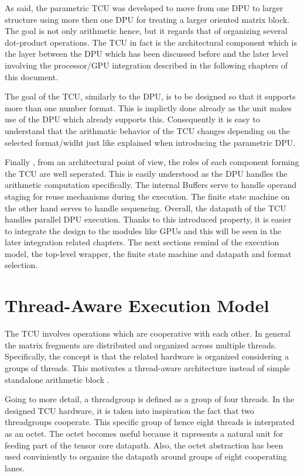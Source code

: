 As said, the parametric TCU was developed to move from one DPU to larger structure using more then one DPU for treating a larger oriented matrix block. The goal is not only arithmetic hence, but it regards that of organizing several dot-product operations. The TCU in fact is the architectural component which is the layer between the DPU which has been discussed before and the later level involving the processor/GPU integration described in the following chapters of this document.

The goal of the TCU, similarly to the DPU, is to be designed so that it supports more than one number format. This is implictly done already as the unit makes use of the DPU which already supports this. Consequently it is easy to understand that the arithmatic behavior of the TCU changes depending on the selected format/widht just like explained when introducing the parametric DPU.

Finally , from an architectural point of view, the roles of each component forming the TCU are well seperated. This is easily understood as the DPU handles the arithmetic computation specifically. The internal Buffers serve to handle operand staging for reuse mechanisms during the execution. The finite state machine on the other hand serves to handle sequencing. Overall, the datapath of the TCU handles parallel DPU execution. Thanks to this introduced property, it is easier to integrate the design to the modules like GPUs and this will be seen in the later integration related chapters. The next sections remind of the execution model, the top-level wrapper, the finite state machine and datapath and format selection.

\section{Thread-Aware Execution Model}


The TCU involves operations which are cooperative with each other.  In general the matrix fregments are distributed and organized across multiple threads. Specifically, the concept is that the related hardware is organized considering a groups of threads. This motivates a thread-aware architecture instead of simple standalone arithmetic block \cite{raihan2019modeling}.


Going to more detail, a threadgroup is defined as a group of four threads. In the designed TCU hardware, it is taken into inspiration the fact that two threadgroups cooperate. This specific group of hence eight threads is interprated as an octet. The octet becomes useful because it rapresents a natural unit for feeding part of the tensor core datapath. Also, the octet abstraction has been used conviniently to organize the datapath around groups of eight cooperating lanes. 

